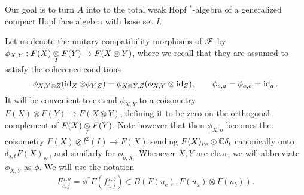 Our goal is to turn $A$ into to the total weak Hopf $^*$-algebra of a generalized compact Hopf face algebra with base set $I$. 



Let us denote the unitary compatibility morphisms of $\mathscr{F}$ by $\phi_{X,Y}:F(X)\underset{I}{\otimes} F(Y)\rightarrow F(X\otimes Y)$, where we recall that they are assumed to satisfy the coherence conditions  \[\phi_{X,Y\otimes Z}(\operatorname{id}_X\otimes \phi_{Y,Z}) = \phi_{X\otimes Y,Z}(\phi_{X,Y}\otimes \operatorname{id}_Z),\qquad \phi_{o,a} = \phi_{a,o} = \operatorname{id}_a.\] It will be convenient to extend $\phi_{X,Y}$ to a coisometry $F(X)\otimes F(Y)\rightarrow F(X\otimes Y)$, defining it to be zero on the orthogonal complement of $F(X)\underset{I}{\otimes} F(Y)$. Note however that then $\phi_{X,o}$ becomes the coisometry $F(X)\otimes l^2(I)\rightarrow F(X)$ sending $F(X)_{rs} \otimes \mathbb{C}\delta_t$ canonically onto $\delta_{s,t}F(X)_{rs}$, and similarly for $\phi_{o,X}$. Whenever $X,Y$ are clear, we will abbreviate $\phi_{X,Y}$ as $\phi$. We will use the notation \[F^{a,b}_{c,j} = \phi^* F(f^{a,b}_{c,j}) \in B(F(u_c),F(u_a)\otimes F(u_b)).\]




